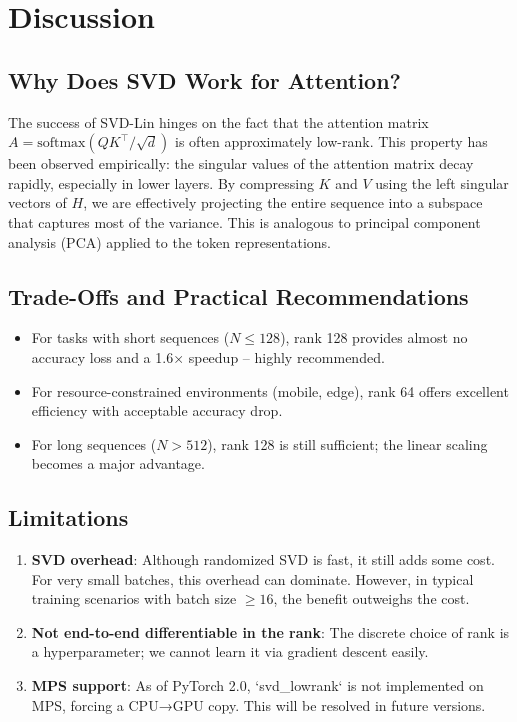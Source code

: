 \section{Discussion}
\subsection{Why Does SVD Work for Attention?}
The success of SVD-Lin hinges on the fact that the attention matrix $A = \text{softmax}(QK^\top/\sqrt{d})$ is often approximately low-rank. This property has been observed empirically: the singular values of the attention matrix decay rapidly, especially in lower layers. By compressing $K$ and $V$ using the left singular vectors of $H$, we are effectively projecting the entire sequence into a subspace that captures most of the variance. This is analogous to principal component analysis (PCA) applied to the token representations.

\subsection{Trade-Offs and Practical Recommendations}
\begin{itemize}
    \item For tasks with short sequences ($N \le 128$), rank 128 provides almost no accuracy loss and a 1.6× speedup – highly recommended.
    \item For resource-constrained environments (mobile, edge), rank 64 offers excellent efficiency with acceptable accuracy drop.
    \item For long sequences ($N > 512$), rank 128 is still sufficient; the linear scaling becomes a major advantage.
\end{itemize}

\subsection{Limitations}
\begin{enumerate}
    \item \textbf{SVD overhead}: Although randomized SVD is fast, it still adds some cost. For very small batches, this overhead can dominate. However, in typical training scenarios with batch size $\ge 16$, the benefit outweighs the cost.
    \item \textbf{Not end-to-end differentiable in the rank}: The discrete choice of rank is a hyperparameter; we cannot learn it via gradient descent easily.
    \item \textbf{MPS support}: As of PyTorch 2.0, `svd\_lowrank` is not implemented on MPS, forcing a CPU→GPU copy. This will be resolved in future versions.
\end{enumerate}

